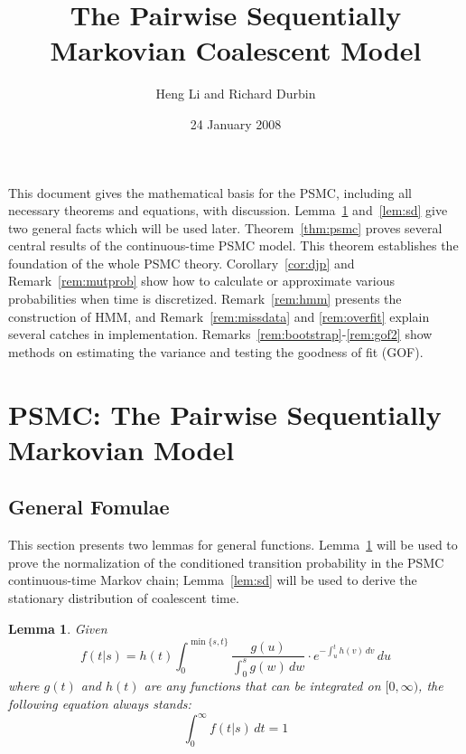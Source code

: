 \documentclass[pdftex,10pt]{article}
\title{The Pairwise Sequentially Markovian Coalescent Model}
\author{Heng Li and Richard Durbin}
\date{24 January 2008}
\begin{document}
\theoremstyle{plain} \newtheorem{lem}{Lemma}
\theoremstyle{plain} \newtheorem{thm}{Theorem}
\theoremstyle{plain} \newtheorem{cor}{Corollary}
\theoremstyle{remark} \newtheorem{rem}{Remark}

\maketitle

This document gives the mathematical basis for the PSMC, including all
necessary theorems and equations, with discussion. Lemma~\ref{lem:f1}
and~\ref{lem:sd} give two general facts which will be used
later. Theorem~\ref{thm:psmc} proves several central results of the
continuous-time PSMC model. This theorem establishes the foundation of
the whole PSMC theory. Corollary~\ref{cor:djp} and
Remark~\ref{rem:mutprob} show how to calculate or approximate various
probabilities when time is discretized. Remark~\ref{rem:hmm} presents
the construction of HMM, and Remark~\ref{rem:missdata} and
\ref{rem:overfit} explain several catches in
implementation. Remarks~\ref{rem:bootstrap}-\ref{rem:gof2} show methods
on estimating the variance and testing the goodness of fit (GOF).

\section{PSMC: The Pairwise Sequentially Markovian Model}

\subsection{General Fomulae}

This section presents two lemmas for general functions. Lemma~\ref{lem:f1}
will be used to prove the normalization of the conditioned transition probability in the PSMC continuous-time Markov chain; Lemma~\ref{lem:sd}
will be used to derive the stationary distribution of coalescent time.

\begin{lem}\label{lem:f1}
Given
\begin{equation}\label{equ:f}
  f(t|s)=h(t)\int_0^{\min\{s,t\}}\frac{g(u)}{\int_0^sg(w)\,dw} \cdot e^{-\int_u^th(v)\,dv}\,du
\end{equation}
where $g(t)$ and $h(t)$ are any functions that can be integrated on $[0,\infty)$, the
following equation always stands:
\[\int_0^{\infty}f(t|s)\,dt=1\]
\end{lem}
\end{document}
